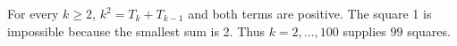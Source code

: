 For every $k\ge2$, $k^2=T_k+T_{k-1}$ and both terms are positive. The square 1 is impossible because the smallest sum is 2. Thus $k=2,\ldots,100$ supplies $\boxed{99}$ squares.
